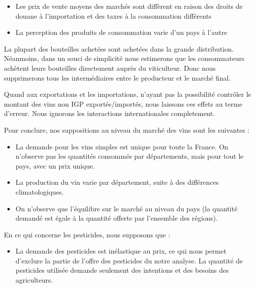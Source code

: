 \documentclass[11pt,]{article}
\begin{document}
\begin{itemize}
    \item Les prix de vente moyens des marchés sont diffèrent en raison des droits de douane à l'importation et des taxes à la consommation différents %
    \item La perception des produits de consommation varie d'un pays à l'autre %
\end{itemize}
\par

La plupart des bouteilles achetées sont achetées dans la grande
distribution. Néanmoins, dans un souci de simplicité nous estimerons que
les consommateurs achètent leurs bouteilles directement auprès du
viticulteur. Donc nous supprimerons tous les intermédiaires entre le
producteur et le marché final.

\par

Quand aux exportations et les importations, n'ayant pas la possibilité
contrôler le montant des vins non IGP exportés/importés, nous laissons
ces effets au terme d'erreur. Nous ignorons les interactions
internationales completement.

\par

Pour conclure, nos suppositions au niveau du marché des vins sont les
suivantes :

\begin{itemize}
    \item La demande pour les vins simples est unique pour toute la France. On n'observe pas les quantités consommés par départements, mais pour tout le pays, avec un prix unique. 
    \item La production du vin varie par département, suite à des différences climatologiques.
    \item On n'observe que l'équilibre sur le marché au niveau du pays (la quantité demandé est égale à la quantité offerte par l'ensemble des régions).
\end{itemize}
\par

En ce qui concerne les pesticides, nous supposons que :

\begin{itemize}
    \item La demande des pesticides est inélastique au prix, ce qui nous permet d'exclure la partie de l'offre des pesticides du notre analyse. La quantité de pesticides utilisée demande seulement des intentions et des besoins des agriculteurs. 
\end{itemize}
\end{document}

